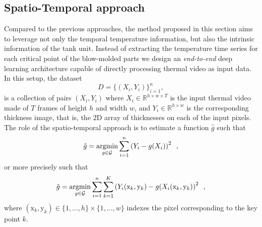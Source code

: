 \subsection{Spatio-Temporal approach} \label{Spatio-temporal approach}

Compared to the previous approaches, the method proposed in this section aims to leverage not only the temporal temperature information, but also the intrinsic information of the tank unit. Instead of extracting the temperature time series for each critical point of the blow-molded parts we design an \textit{end-to-end} deep learning architecture capable of directly processing thermal video as input data.
%
% 
In this setup, the dataset
\begin{equation}
    D = \{(X_{i}, Y_{i})\}_{i=1}^{n},
\end{equation}
is a collection of pairs $(X_{i}, Y_{i})$ where $X_{i} \in \mathds{R}^{h \times w \times T}$ is the input thermal video made of $T$ frames of height $h$ and width $w$, and $Y_{i} \in \mathds{R}^{h \times w}$ is the corresponding thickness image, that is, the 2D array of thicknesses on each of the input pixels. The role of the spatio-temporal approach is to estimate a function $\hat{g}$ such that
\begin{equation}
    \hat{g} = \operatorname*{argmin}_{g\in\mathcal{G}} \sum_{i=1}^n \left( Y_{i} - g(X_{i})\right)^2 \enspace,
\end{equation}
or more precisely such that
\begin{equation}
    \hat{g} = \operatorname*{argmin}_{g\in\mathcal{G}} \sum_{i=1}^n \sum_{k=1}^K \left( Y_{i}(\mathrm{x}_k, \mathrm{y}_k) - g(X_{i}(\mathrm{x}_k, \mathrm{y}_k)\right)^2 \enspace,
\end{equation}
where $(\mathrm{x}_k, \mathrm{y}_k) \in \{1,\ldots,h\}\times\{1,\ldots,w\}$ indexes the pixel corresponding to the key point $k$.

